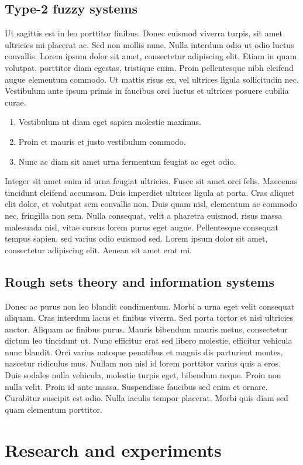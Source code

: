 \documentclass[english,masters]{wizthesis}
\begin{document}
{
\section{Type-2 fuzzy systems}

Ut sagittis est in leo porttitor finibus. Donec euismod viverra turpis, sit amet
ultricies mi placerat ac. Sed non mollis nunc. Nulla interdum odio ut odio
luctus convallis. Lorem ipsum dolor sit amet, consectetur adipiscing elit. Etiam
in quam volutpat, porttitor diam egestas, tristique enim. Proin pellentesque
nibh eleifend augue elementum commodo. Ut mattis risus ex, vel ultrices ligula
sollicitudin nec. Vestibulum ante ipsum primis in faucibus orci luctus et
ultrices posuere cubilia curae.
\begin{enumerate}[noitemsep]
  \item Vestibulum ut diam eget sapien molestie maximus.
  \item Proin et mauris et justo vestibulum commodo.
  \item Nunc ac diam sit amet urna fermentum feugiat ac eget odio.
\end{enumerate}
Integer sit amet enim id urna feugiat ultricies. Fusce sit amet orci felis.
Maecenas tincidunt eleifend accumsan. Duis imperdiet ultrices ligula at porta.
Cras aliquet elit dolor, et volutpat sem convallis non. Duis quam nisl,
elementum ac commodo nec, fringilla non sem. Nulla consequat, velit a pharetra
euismod, risus massa malesuada nisl, vitae cursus lorem purus eget augue.
Pellentesque consequat tempus sapien, sed varius odio euismod sed. Lorem ipsum
dolor sit amet, consectetur adipiscing elit. Aenean sit amet erat mi.
\section{Rough sets theory and information systems}

Donec ac purus non leo blandit condimentum. Morbi a urna eget velit consequat
aliquam. Cras interdum lacus et finibus viverra. Sed porta tortor et nisi
ultricies auctor. Aliquam ac finibus purus. Mauris bibendum mauris metus,
consectetur dictum leo tincidunt ut. Nunc efficitur erat sed libero molestie,
efficitur vehicula nunc blandit. Orci varius natoque penatibus et magnis dis
parturient montes, nascetur ridiculus mus. Nullam non nisl id lorem porttitor
varius quis a eros. Duis sodales nulla vehicula, molestie turpis eget, bibendum
neque. Proin non nulla velit. Proin id ante massa. Suspendisse faucibus sed enim
et ornare. Curabitur suscipit est odio. Nulla iaculis tempor placerat. Morbi
quis diam sed quam elementum porttitor.
}

\chapter{Research and experiments}
\



\listoffigures

\listoftables

\listoflistings
\end{document}

